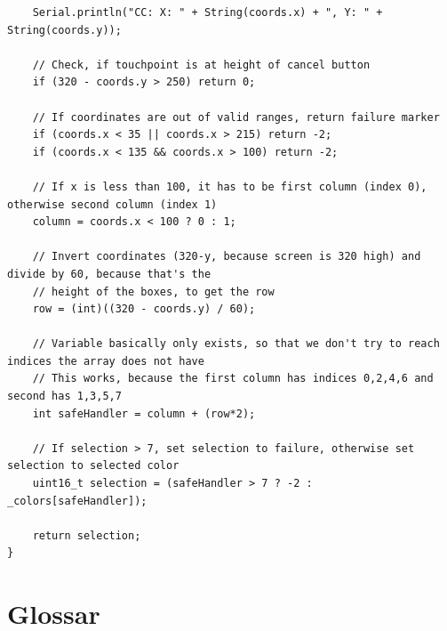 \documentclass[a4paper, 11pt]{scrartcl}
\begin{document}
\begin{small}
\begin{lstlisting}
    Serial.println("CC: X: " + String(coords.x) + ", Y: " + String(coords.y));

    // Check, if touchpoint is at height of cancel button
    if (320 - coords.y > 250) return 0;

    // If coordinates are out of valid ranges, return failure marker
    if (coords.x < 35 || coords.x > 215) return -2;
    if (coords.x < 135 && coords.x > 100) return -2;

    // If x is less than 100, it has to be first column (index 0), otherwise second column (index 1)
    column = coords.x < 100 ? 0 : 1;

    // Invert coordinates (320-y, because screen is 320 high) and divide by 60, because that's the 
    // height of the boxes, to get the row
    row = (int)((320 - coords.y) / 60);

    // Variable basically only exists, so that we don't try to reach indices the array does not have
    // This works, because the first column has indices 0,2,4,6 and second has 1,3,5,7
    int safeHandler = column + (row*2);

    // If selection > 7, set selection to failure, otherwise set selection to selected color
    uint16_t selection = (safeHandler > 7 ? -2 : _colors[safeHandler]);

    return selection;
}
\end{lstlisting}











\end{small}
\newpage
\section{Glossar}
\end{document}
